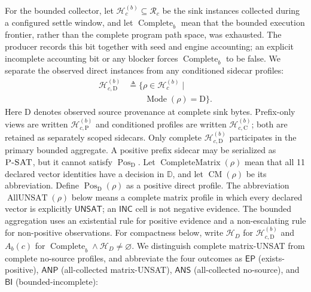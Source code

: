 For the bounded collector, let
$\mathcal H_c^{(b)}\subseteq\mathcal R_c$ be the sink instances collected during
a configured settle window, and let $\operatorname{Complete}_b$ mean that the
bounded execution frontier, rather than the complete program path space, was
exhausted. The producer records this bit together with seed and engine
accounting; an explicit incomplete accounting bit or any blocker forces
$\operatorname{Complete}_b$ to be false. We separate the observed direct instances from any conditioned
sidecar profiles:
\[
\begin{aligned}
\mathcal H_{c,\mathrm D}^{(b)}
 &\triangleq \{\rho\in\mathcal H_c^{(b)}\mid\\[-1mm]
 &\qquad \operatorname{Mode}(\rho)=\mathrm D\}.
\end{aligned}
\]
Here $\mathrm D$ denotes observed source provenance at complete sink bytes.
Prefix-only views are written $\mathcal H_{c,\mathrm P}^{(b)}$ and conditioned
profiles are written $\mathcal H_{c,\mathrm C}^{(b)}$; both are retained as
separately scoped sidecars. Only complete $\mathcal H_{c,\mathrm D}^{(b)}$
participates in the primary bounded aggregate. A positive prefix sidecar may be
serialized as $\textsc{P-SAT}$, but it cannot satisfy $\operatorname{Pos}_{\mathrm D}$. Let
$\operatorname{CompleteMatrix}(\rho)$ mean that all 11 declared vector
identities have a decision in $\mathbb D$, and let $\operatorname{CM}(\rho)$ be
its abbreviation. Define $\operatorname{Pos}_{\mathrm D}(\rho)$ as a positive
direct profile. The abbreviation $\operatorname{AllUNSAT}(\rho)$ below means a
complete matrix profile in which every declared vector is explicitly
$\mathsf{UNSAT}$; an $\mathsf{INC}$ cell is not negative evidence. The
bounded aggregation uses an existential rule for positive evidence and a
non-escalating rule for non-positive observations. For compactness below, write
$\mathcal H_D$ for $\mathcal H_{c,\mathrm D}^{(b)}$ and $A_b(c)$ for
$\operatorname{Complete}_b\land\mathcal H_D\neq\varnothing$. We distinguish complete
matrix-UNSAT from complete no-source profiles, and abbreviate the four
outcomes as $\mathsf{EP}$ (exists-positive), $\mathsf{ANP}$
(all-collected matrix-UNSAT), $\mathsf{ANS}$ (all-collected no-source), and
$\mathsf{BI}$ (bounded-incomplete):


